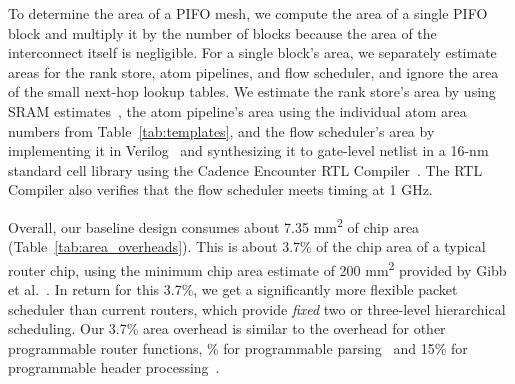 To determine the area of a PIFO mesh, we compute the area of a single PIFO
block and multiply it by the number of blocks because the area of the
interconnect itself is negligible.  For a single block's area, we separately
estimate areas for the rank store, atom pipelines, and flow scheduler, and
ignore the area of the small next-hop lookup tables.  We estimate the rank
store's area by using SRAM estimates~\cite{sram_estimate}, the atom pipeline's
area using the individual atom area numbers from Table~\ref{tab:templates}, and
the flow scheduler's area by implementing it in Verilog~\cite{system_verilog}
and synthesizing it to gate-level netlist in a 16-nm standard cell library
using the Cadence Encounter RTL Compiler~\cite{cadence_rc}. The RTL Compiler
also verifies that the flow scheduler meets timing at 1 GHz.

Overall, our baseline design consumes about 7.35 \si{\milli\metre\squared} of
chip area (Table~\ref{tab:area_overheads}). This is about 3.7\% of the chip
area of a typical router chip, using the minimum chip area estimate of 200
\si{\milli\metre\squared} provided by Gibb et al.~\cite{glen_parsing}. In
return for this 3.7\%, we get a significantly more flexible packet scheduler
than current routers, which provide {\em fixed} two or three-level hierarchical
scheduling. Our 3.7\% area overhead is similar to the overhead for other
programmable router functions, \% for programmable
parsing~\cite{glen_parsing} and 15\% for programmable header
processing~\cite{rmt}.
 

